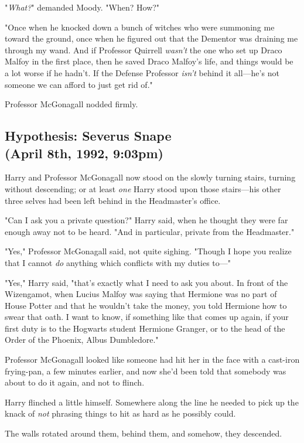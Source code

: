 "\emph{What?}" demanded Moody. "When? How?"

"Once when he knocked down a bunch of witches who were summoning me toward the 
ground, once when he figured out that the Dementor was draining me through my 
wand. And if Professor Quirrell \emph{wasn't} the one who set up Draco Malfoy 
in the first place, then he saved Draco Malfoy's life, and things would be a 
lot worse if he hadn't. If the Defense Professor \emph{isn't} behind it 
all---he's not someone we can afford to just get rid of."

Professor McGonagall nodded firmly.
\sbreak
\vspace{-2\baselineskip}
\subsection{Hypothesis: Severus Snape\\
(April 8th, 1992, 9:03pm)}

Harry and Professor McGonagall now stood on the slowly turning stairs, turning 
without descending; or at least \emph{one} Harry stood upon those stairs---his 
other three selves had been left behind in the Headmaster's office.

"Can I ask you a private question?" Harry said, when he thought they were far 
enough away not to be heard. "And in particular, private from the Headmaster."

"Yes," Professor McGonagall said, not quite sighing. "Though I hope you realize 
that I cannot \emph{do} anything which conflicts with my duties to---"

"Yes," Harry said, "that's exactly what I need to ask you about. In front of 
the Wizengamot, when Lucius Malfoy was saying that Hermione was no part of 
House Potter and that he wouldn't take the money, you told Hermione how to 
swear that oath. I want to know, if something like that comes up again, if your 
first duty is to the Hogwarts student Hermione Granger, or to the head of the 
Order of the Phoenix, Albus Dumbledore."

Professor McGonagall looked like someone had hit her in the face with a 
cast-iron frying-pan, a few minutes earlier, and now she'd been told that 
somebody was about to do it again, and not to flinch.

Harry flinched a little himself. Somewhere along the line he needed to pick up 
the knack of \emph{not} phrasing things to hit as hard as he possibly could.

The walls rotated around them, behind them, and somehow, they descended.

